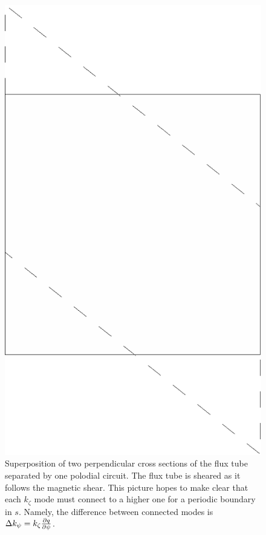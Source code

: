 \documentclass[a4paper,10pt]{article}
\begin{document}
\begin{figure}[ht!]
 \begin{center}
 \includegraphics[scale=0.3]{shear.eps}
\caption{Superposition of two perpendicular cross sections of the flux tube separated by one polodial circuit.  The flux tube is sheared as it follows the magnetic shear.  This picture hopes to make clear that each $k_\zeta$ mode must connect to a higher one for a periodic boundary in $s$.  Namely, the difference between connected modes is $\Delta k_\psi = k_\zeta {\partial q \over \partial \psi}$. }
 \label{fig.shear}
\end{center}
\end{figure}
\end{document}
